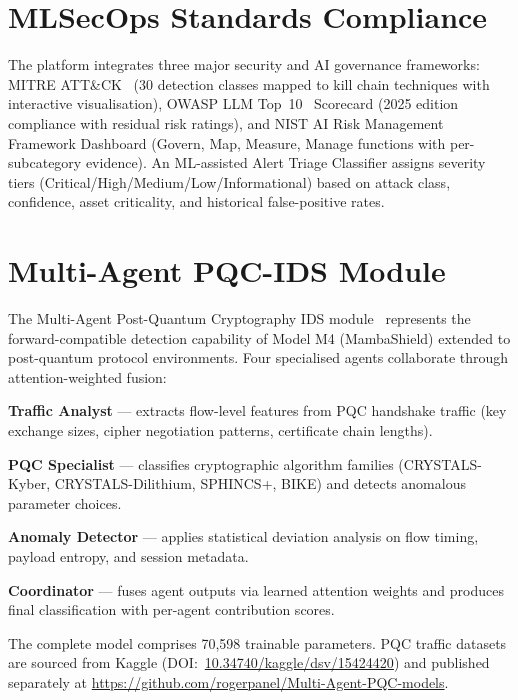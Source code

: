 \section{MLSecOps Standards Compliance}
\label{sec:mlsecops}

The platform integrates three major security and AI governance frameworks: MITRE ATT\&CK~\cite{Hernandez2015} (30 detection classes mapped to kill chain techniques with interactive visualisation), OWASP LLM Top~10~\cite{Xiong2020} Scorecard (2025 edition compliance with residual risk ratings), and NIST AI Risk Management Framework Dashboard (Govern, Map, Measure, Manage functions with per-subcategory evidence). An ML-assisted Alert Triage Classifier assigns severity tiers (Critical/High/Medium/Low/Informational) based on attack class, confidence, asset criticality, and historical false-positive rates.


\section{Multi-Agent PQC-IDS Module}
\label{sec:pqc_module}

The Multi-Agent Post-Quantum Cryptography IDS module~\cite{Anaedevha2026mapqc,NIST2024} represents the forward-compatible detection capability of Model M4 (MambaShield) extended to post-quantum protocol environments. Four specialised agents collaborate through attention-weighted fusion:

\noindent\textbf{Traffic Analyst} --- extracts flow-level features from PQC handshake traffic (key exchange sizes, cipher negotiation patterns, certificate chain lengths).

\noindent\textbf{PQC Specialist} --- classifies cryptographic algorithm families (CRYSTALS-Kyber, CRYSTALS-Dilithium, SPHINCS+, BIKE) and detects anomalous parameter choices.

\noindent\textbf{Anomaly Detector} --- applies statistical deviation analysis on flow timing, payload entropy, and session metadata.

\noindent\textbf{Coordinator} --- fuses agent outputs via learned attention weights and produces final classification with per-agent contribution scores.

The complete model comprises 70,598 trainable parameters. PQC traffic datasets are sourced from Kaggle (DOI:~\url{10.34740/kaggle/dsv/15424420}) and published separately at \url{https://github.com/rogerpanel/Multi-Agent-PQC-models}.


